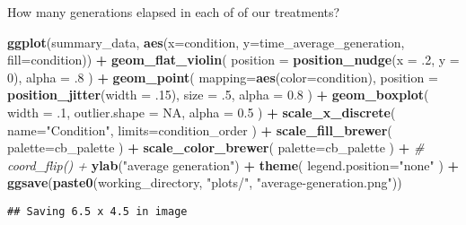 \documentclass[]{book}
\newenvironment{Shaded}{\begin{snugshade}}{\end{snugshade}}
\newcommand{\CommentTok}[1]{\textcolor[rgb]{0.56,0.35,0.01}{\textit{#1}}}
\newcommand{\DataTypeTok}[1]{\textcolor[rgb]{0.13,0.29,0.53}{#1}}
\newcommand{\DecValTok}[1]{\textcolor[rgb]{0.00,0.00,0.81}{#1}}
\newcommand{\FloatTok}[1]{\textcolor[rgb]{0.00,0.00,0.81}{#1}}
\newcommand{\KeywordTok}[1]{\textcolor[rgb]{0.13,0.29,0.53}{\textbf{#1}}}
\newcommand{\NormalTok}[1]{#1}
\newcommand{\OperatorTok}[1]{\textcolor[rgb]{0.81,0.36,0.00}{\textbf{#1}}}
\newcommand{\OtherTok}[1]{\textcolor[rgb]{0.56,0.35,0.01}{#1}}
\newcommand{\StringTok}[1]{\textcolor[rgb]{0.31,0.60,0.02}{#1}}
\begin{document}
How many generations elapsed in each of of our treatments?

\begin{Shaded}
\begin{Highlighting}[]
\KeywordTok{ggplot}\NormalTok{(summary_data, }\KeywordTok{aes}\NormalTok{(}\DataTypeTok{x=}\NormalTok{condition, }\DataTypeTok{y=}\NormalTok{time_average_generation, }\DataTypeTok{fill=}\NormalTok{condition)) }\OperatorTok{+}
\StringTok{  }\KeywordTok{geom_flat_violin}\NormalTok{(}
    \DataTypeTok{position =} \KeywordTok{position_nudge}\NormalTok{(}\DataTypeTok{x =} \FloatTok{.2}\NormalTok{, }\DataTypeTok{y =} \DecValTok{0}\NormalTok{),}
    \DataTypeTok{alpha =} \FloatTok{.8}
\NormalTok{  ) }\OperatorTok{+}
\StringTok{  }\KeywordTok{geom_point}\NormalTok{(}
    \DataTypeTok{mapping=}\KeywordTok{aes}\NormalTok{(}\DataTypeTok{color=}\NormalTok{condition),}
    \DataTypeTok{position =} \KeywordTok{position_jitter}\NormalTok{(}\DataTypeTok{width =} \FloatTok{.15}\NormalTok{),}
    \DataTypeTok{size =} \FloatTok{.5}\NormalTok{,}
    \DataTypeTok{alpha =} \FloatTok{0.8}
\NormalTok{  ) }\OperatorTok{+}
\StringTok{  }\KeywordTok{geom_boxplot}\NormalTok{(}
    \DataTypeTok{width =} \FloatTok{.1}\NormalTok{,}
    \DataTypeTok{outlier.shape =} \OtherTok{NA}\NormalTok{,}
    \DataTypeTok{alpha =} \FloatTok{0.5}
\NormalTok{  ) }\OperatorTok{+}
\StringTok{  }\KeywordTok{scale_x_discrete}\NormalTok{(}
    \DataTypeTok{name=}\StringTok{"Condition"}\NormalTok{,}
    \DataTypeTok{limits=}\NormalTok{condition_order}
\NormalTok{  ) }\OperatorTok{+}
\StringTok{  }\KeywordTok{scale_fill_brewer}\NormalTok{(}
    \DataTypeTok{palette=}\NormalTok{cb_palette}
\NormalTok{  ) }\OperatorTok{+}
\StringTok{  }\KeywordTok{scale_color_brewer}\NormalTok{(}
    \DataTypeTok{palette=}\NormalTok{cb_palette}
\NormalTok{  ) }\OperatorTok{+}
\StringTok{  }\CommentTok{# coord_flip() +}
\StringTok{  }\KeywordTok{ylab}\NormalTok{(}\StringTok{"average generation"}\NormalTok{) }\OperatorTok{+}
\StringTok{  }\KeywordTok{theme}\NormalTok{(}
    \DataTypeTok{legend.position=}\StringTok{"none"}
\NormalTok{  ) }\OperatorTok{+}
\StringTok{  }\KeywordTok{ggsave}\NormalTok{(}\KeywordTok{paste0}\NormalTok{(working_directory, }\StringTok{"plots/"}\NormalTok{, }\StringTok{"average-generation.png"}\NormalTok{))}
\end{Highlighting}
\end{Shaded}

\begin{verbatim}
## Saving 6.5 x 4.5 in image
\end{verbatim}
\end{document}
